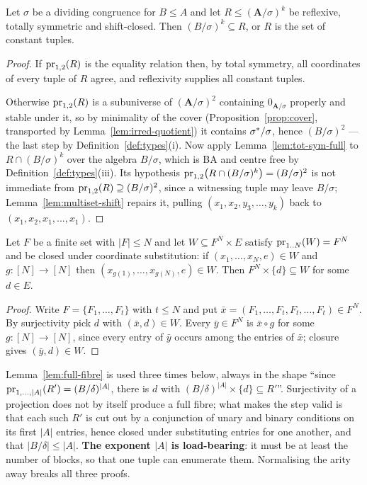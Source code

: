 \begin{lemma}\label{lem:tot-sym-irred}
Let $\sigma$ be a dividing congruence for $B\le A$ and let
$R\le(\mathbf A/\sigma)^{k}$ be reflexive, totally symmetric and shift-closed.
Then $(B/\sigma)^{k}\subseteq R$, or $R$ is the set of constant tuples.
\end{lemma}

\begin{proof}
If $\operatorname*{pr}_{1,2}(R)$ is the equality relation then, by total symmetry, all
coordinates of every tuple of $R$ agree, and reflexivity supplies all constant
tuples.

Otherwise $\operatorname*{pr}_{1,2}(R)$ is a subuniverse of $(\mathbf A/\sigma)^{2}$
containing $0_{\mathbf A/\sigma}$ properly and stable under it, so by
minimality of the cover (Proposition~\ref{prop:cover}, transported by
Lemma~\ref{lem:irred-quotient}) it contains $\sigma^{*}/\sigma$, hence
$(B/\sigma)^{2}$ --- the last step by Definition~\ref{def:types}(i). Now apply
Lemma~\ref{lem:tot-sym-full} to $R\cap(B/\sigma)^{k}$ over the algebra
$B/\sigma$, which is BA and centre free by Definition~\ref{def:types}(iii). Its
hypothesis $\operatorname*{pr}_{1,2}\bigl(R\cap(B/\sigma)^{k}\bigr)=(B/\sigma)^{2}$ is not
immediate from $\operatorname*{pr}_{1,2}(R)\supseteq(B/\sigma)^{2}$, since a witnessing
tuple may leave $B/\sigma$; Lemma~\ref{lem:multiset-shift} repairs it, pulling
$(x_{1},x_{2},y_{3},\dots,y_{k})$ back to $(x_{1},x_{2},x_{1},\dots,x_{1})$.
\end{proof}

\begin{lemma}\label{lem:full-fibre}
Let $F$ be a finite set with $|F|\le N$ and let $W\subseteq F^{N}\times E$
satisfy $\operatorname*{pr}_{1..N}(W)=F^{N}$ and be closed under coordinate substitution: if
$(x_{1},\dots,x_{N},e)\in W$ and $g:[N]\to[N]$ then
$(x_{g(1)},\dots,x_{g(N)},e)\in W$. Then $F^{N}\times\{d\}\subseteq W$ for some
$d\in E$.
\end{lemma}

\begin{proof}
Write $F=\{F_{1},\dots,F_{t}\}$ with $t\le N$ and put
$\bar x=(F_{1},\dots,F_{t},F_{t},\dots,F_{t})\in F^{N}$. By surjectivity pick
$d$ with $(\bar x,d)\in W$. Every $\bar y\in F^{N}$ is $\bar x\circ g$ for some
$g:[N]\to[N]$, since every entry of $\bar y$ occurs among the entries of
$\bar x$; closure gives $(\bar y,d)\in W$.
\end{proof}

\begin{hazard}\label{haz:full-fibre}
Lemma~\ref{lem:full-fibre} is used three times below, always in the shape
``since $\operatorname*{pr}_{1,\dots,|A|}(R')=(B/\delta)^{|A|}$, there is $d$ with
$(B/\delta)^{|A|}\times\{d\}\subseteq R'$''. Surjectivity of a projection does
not by itself produce a full fibre; what makes the step valid is that each such
$R'$ is cut out by a conjunction of unary and binary conditions on its first
$|A|$ entries, hence closed under substituting entries for one another, and
that $|B/\delta|\le|A|$. \textbf{The exponent $|A|$ is load-bearing}: it must be
at least the number of blocks, so that one tuple can enumerate them.
Normalising the arity away breaks all three proofs.
\end{hazard}

